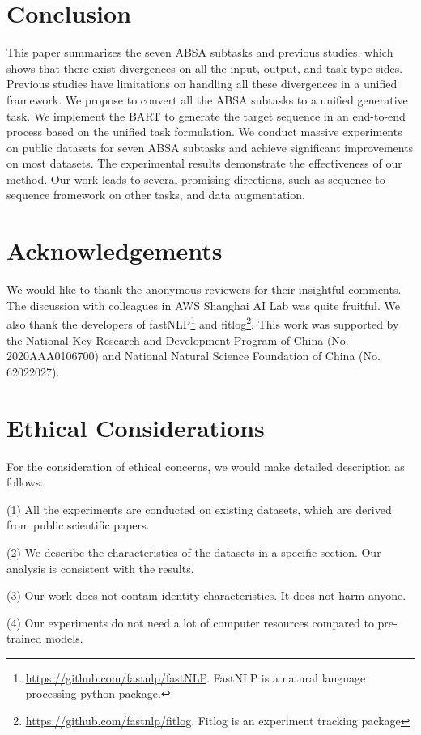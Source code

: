 \documentclass[11pt,a4paper]{article}
\begin{document}
\section{Conclusion}
This paper summarizes the seven ABSA subtasks and previous studies, which shows that there exist divergences on all the input, output, and task type sides. Previous studies have limitations on handling all these divergences in a unified framework. We propose to convert all the ABSA subtasks to a unified generative task. We implement the BART to generate the target sequence in an end-to-end process based on the unified task formulation. We conduct massive experiments on public datasets for seven ABSA subtasks and achieve significant improvements on most datasets. The experimental results demonstrate the effectiveness of our method. Our work leads to several promising directions, such as sequence-to-sequence framework on other tasks, and data augmentation.


\section*{Acknowledgements}
We would like to thank the anonymous reviewers for their insightful comments. The discussion with colleagues in AWS Shanghai AI Lab was quite fruitful. We also thank the developers of fastNLP\footnote{\url{https://github.com/fastnlp/fastNLP}. FastNLP is a natural language processing python package.} and fitlog\footnote{\url{https://github.com/fastnlp/fitlog}. Fitlog is an experiment tracking package}. This work was supported by the National Key Research and Development Program of China (No. 2020AAA0106700) and National Natural Science Foundation of China (No. 62022027).



\section*{Ethical Considerations}
For the consideration of ethical concerns, we would make detailed description  as follows:

(1) All the experiments are conducted on existing datasets, which are derived from public scientific papers.

(2) We describe the characteristics of the datasets in a specific section. Our analysis is consistent with the results.

(3) Our work does not contain identity characteristics. It does not harm anyone.

(4) Our experiments do not  need a lot of computer resources compared to pre-trained models.
\end{document}

